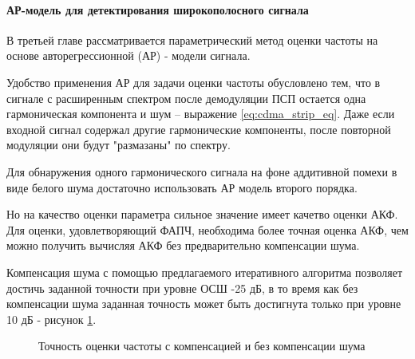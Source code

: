 \paragraph{АР-модель для детектирования широкополосного сигнала}
В третьей главе рассматривается параметрический метод оценки частоты на основе авторегрессионной (АР) - модели сигнала.

Удобство применения АР для задачи оценки частоты обусловлено тем, что в сигнале с расширенным спектром после демодуляции ПСП остается одна
гармоническая компонента и шум – выражение \ref{eq:cdma_strip_eq}.  Даже если входной сигнал содержал другие гармонические компоненты,
после повторной модуляции они будут "размазаны" по спектру.

Для обнаружения одного гармонического сигнала на фоне аддитивной помехи в виде белого шума достаточно использовать АР модель второго порядка.

Но на качество оценки параметра сильное значение имеет качетво оценки АКФ. Для оценки, удовлетворяющий ФАПЧ, необходима более точная
оценка АКФ, чем можно получить вычисляя АКФ без предварительно компенсации шума.

Компенсация шума с помощью предлагаемого итеративного алгоритма позволяет достичь заданной точности при уровне ОСШ -25 дБ, в то
время как без компенсации шума заданная точность может быть достигнута только при уровне 10 дБ - рисунок \ref{pic:ACF_boost}.

\begin{figure}[H]
\center{}
	\caption{Точность оценки частоты с компенсацией и без компенсации шума}
	\label{pic:ACF_boost}
\end{figure}
